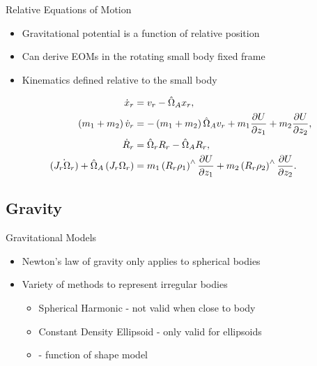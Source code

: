 \begin{frame}{Relative Equations of Motion}

\begin{itemize}
    \item Gravitational potential is a function of relative position
    \item Can derive EOMs in the rotating small body fixed frame
    \item Kinematics defined relative to the small body
\end{itemize}
\pause
\begin{align*}
    \dot{x}_r &= v_r - \hat{\Omega}_A x_r, \\
    \left( m_1 + m_2 \right) \dot{v}_r  &= -\left( m_1 + m_2 \right) \hat{\Omega}_A v_r + m_1 \frac{\partial U}{\partial z_1} + m_2 \frac{\partial U}{\partial z_2}, \\
    \dot{R}_r &= \hat{\Omega}_r R_r  - \hat{\Omega}_A R_r , \\
    \dot{\left( J_r  \Omega_r \right)} + \hat{\Omega}_A \left( J_r  \Omega_r \right) &= m_1 \left( R_r  \rho_1 \right)^\wedge \frac{\partial U}{\partial z_1} + m_2 \left( R_r  \rho_2 \right)^\wedge \frac{\partial U}{\partial z_2}.
\end{align*}
\end{frame}

\subsection{Gravity}

\begin{frame}{Gravitational Models}
    \begin{center}
        
    \end{center}
    \pause
    \begin{itemize}
        \item Newton's law of gravity only applies to spherical bodies
        \item Variety of methods to represent irregular bodies
            \begin{itemize}
                \item Spherical Harmonic - not valid when close to body
                \item Constant Density Ellipsoid - only valid for ellipsoids
                \item {} - function of shape model 
            \end{itemize}
    \end{itemize}
\end{frame}

